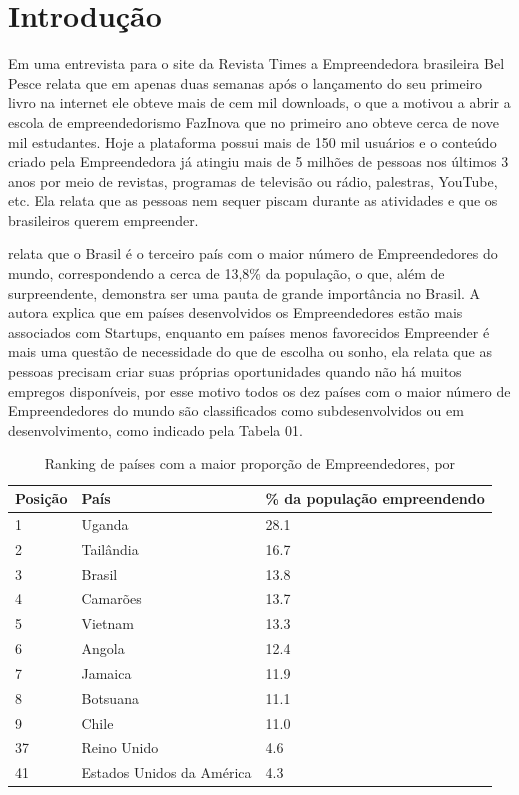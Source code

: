 \chapter{Introdução}
\label{cap-introducao}

Em uma entrevista para o site da Revista Times a Empreendedora brasileira Bel Pesce relata que em apenas duas semanas após o lançamento do seu primeiro livro na internet ele obteve mais de cem mil downloads, o que a motivou a abrir a escola de empreendedorismo FazInova que no primeiro ano obteve cerca de nove mil estudantes. Hoje a plataforma possui mais de 150 mil usuários e o conteúdo criado pela Empreendedora já atingiu mais de 5 milhões de pessoas nos últimos 3 anos por meio de revistas, programas de televisão ou rádio, palestras, YouTube, etc. Ela relata que as pessoas nem sequer piscam durante as atividades e que os brasileiros querem empreender.

 relata que o Brasil é o terceiro país com o maior número de Empreendedores do mundo, correspondendo a cerca de 13,8\% da população, o que, além de surpreendente, demonstra ser uma pauta de grande importância no Brasil. A autora explica que em países desenvolvidos os Empreendedores estão mais associados com Startups, enquanto em países menos favorecidos Empreender é mais uma questão de necessidade do que de escolha ou sonho, ela relata que as pessoas precisam criar suas próprias oportunidades quando não há muitos empregos disponíveis, por esse motivo todos os dez países com o maior número de Empreendedores do mundo são classificados como subdesenvolvidos ou em desenvolvimento, como indicado pela Tabela 01.

\begin{table}[!htb]
	\centering
	\label{tabela:ranking_de_paises_com_mais_empreendedores}
	\begin{tabular}{ | p{3cm} | p{8cm} | p{4cm} | }
		\hline
		Posição & País & \% da população empreendendo \\ \hline
		1 & Uganda & 28.1 \\ \hline
		2 & Tailândia & 16.7 \\ \hline
		3 & Brasil & 13.8 \\ \hline
		4 & Camarões & 13.7 \\ \hline
		5 & Vietnam & 13.3 \\ \hline
		6 & Angola & 12.4 \\ \hline
		7 & Jamaica & 11.9 \\ \hline
		8 & Botsuana & 11.1 \\ \hline
		9 & Chile & 11.0 \\ \hline
		37 & Reino Unido & 4.6 \\ \hline
		41 & Estados Unidos da América & 4.3 \\ \hline
	\end{tabular}
	\caption{Ranking de países com a maior proporção de Empreendedores, por \cite{Brinded2015}}
\end{table}

